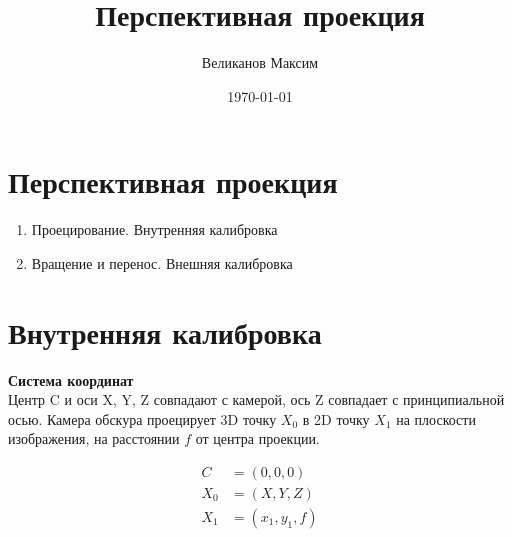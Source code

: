 \documentclass[addpoints]{exam}
\title{Перспективная проекция}
\author{Великанов Максим}
\date{\today}
\begin{document}
    \maketitle


    \section*{Перспективная проекция}
    
    \begin{enumerate}
    	\item Проецирование. Внутренняя калибровка
    	\item Вращение и перенос. Внешняя калибровка
    \end{enumerate}
    

    \section{Внутренняя калибровка}
    
    
    {\bf Система координат}\\
    Центр C и оси X, Y, Z совпадают с камерой,
    ось Z совпадает с принципиальной осью.
    Камера обскура проецирует 3D точку \( X_0 \) в 2D точку \( X_1 \)
    на плоскости изображения, на расстоянии \( f \) от центра проекции.
    
    
    \[
    \begin{aligned}
    	C &= (0, 0, 0)\\
    	X_0 &= (X, Y, Z)\\
    	X_1 &= (x_1, y_1, f)
    \end{aligned}    
    \]
    
\end{document}
